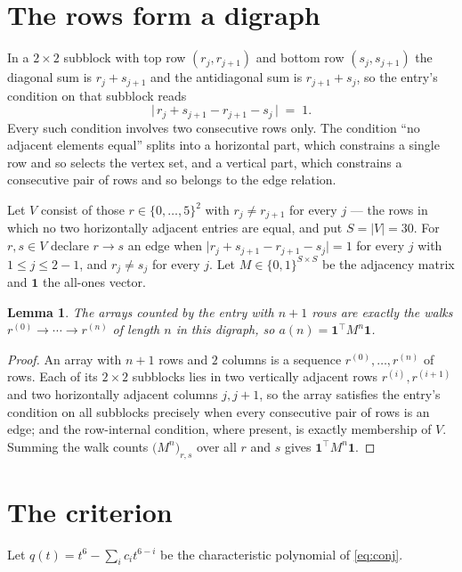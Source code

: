 \documentclass[11pt,a4paper]{article}
\theoremstyle{plain}
\newtheorem{lemma}[theorem]{Lemma}
\theoremstyle{definition}
\begin{document}
\section{The rows form a digraph}

In a $2\times2$ subblock with top row $(r_j,r_{j+1})$ and bottom row $(s_j,s_{j+1})$ the
diagonal sum is $r_j+s_{j+1}$ and the antidiagonal sum is $r_{j+1}+s_j$, so the entry's
condition on that subblock reads
\[
\bigl|\,r_j+s_{j+1}-r_{j+1}-s_j\,\bigr|\;=\;1.
\]
Every such condition involves two consecutive rows only. The condition ``no adjacent elements equal'' splits into a horizontal
part, which constrains a single row and so selects the vertex set, and a vertical part,
which constrains a consecutive pair of rows and so belongs to the edge relation.

Let $V$ consist of those $r\in\{0,\dots,5\}^{2}$ with $r_j\ne r_{j+1}$ for every
$j$ --- the rows in which no two horizontally adjacent entries are equal, and put $S=|V|=30$. For $r,s\in V$ declare $r\to s$ an edge
when $\bigl|r_j+s_{j+1}-r_{j+1}-s_j\bigr|=1$ for every $j$ with
$1\le j\le2-1$, and $r_j\ne s_j$ for every $j$. Let $M\in\{0,1\}^{S\times S}$ be the adjacency matrix and $\mathbf{1}$
the all-ones vector.

\begin{lemma}\label{lem:walk}
The arrays counted by the entry with $n+1$ rows are exactly the walks
$r^{(0)}\to\cdots\to r^{(n)}$ of length $n$ in this digraph, so
$a(n)=\mathbf{1}^{\!\top}M^{n}\mathbf{1}$.
\end{lemma}

\begin{proof}
An array with $n+1$ rows and $2$ columns is a sequence $r^{(0)},\dots,r^{(n)}$ of
rows. Each of its $2\times2$ subblocks lies in two vertically adjacent rows
$r^{(i)},r^{(i+1)}$ and two horizontally adjacent columns $j,j+1$, so the array satisfies
the entry's condition on all subblocks precisely when every consecutive pair of rows is an
edge; and the row-internal condition, where present, is exactly membership of $V$. Summing
the walk counts $\bigl(M^{n}\bigr)_{r,s}$ over all $r$ and $s$ gives
$\mathbf{1}^{\!\top}M^{n}\mathbf{1}$.
\end{proof}

\section{The criterion}

Let $q(t)=t^{6}-\sum_i c_i t^{6-i}$ be the characteristic polynomial of
\eqref{eq:conj}.
\end{document}
